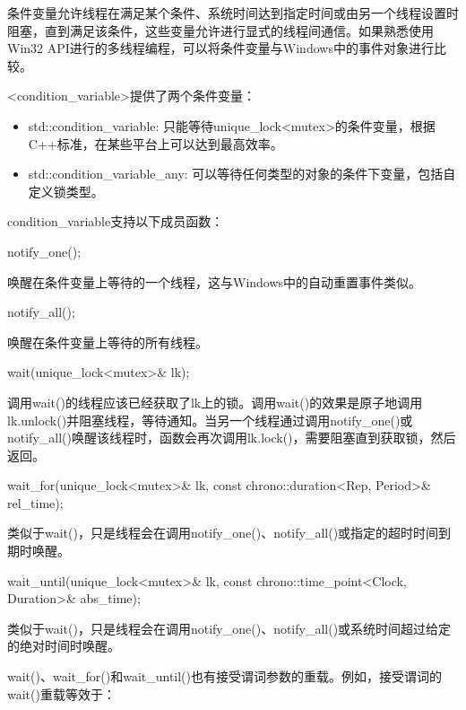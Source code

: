 
条件变量允许线程在满足某个条件、系统时间达到指定时间或由另一个线程设置时阻塞，直到满足该条件，这些变量允许进行显式的线程间通信。如果熟悉使用Win32 API进行的多线程编程，可以将条件变量与Windows中的事件对象进行比较。

<condition\_variable>提供了两个条件变量：

\begin{itemize}
\item
std::condition\_variable: 只能等待unique\_lock<mutex>的条件变量，根据C++标准，在某些平台上可以达到最高效率。

\item
std::condition\_variable\_any: 可以等待任何类型的对象的条件下变量，包括自定义锁类型。
\end{itemize}

condition\_variable支持以下成员函数：

\begin{cpp}
notify_one();
\end{cpp}

唤醒在条件变量上等待的一个线程，这与Windows中的自动重置事件类似。

\begin{cpp}
notify_all();
\end{cpp}

唤醒在条件变量上等待的所有线程。

\begin{cpp}
wait(unique_lock<mutex>& lk);
\end{cpp}

调用wait()的线程应该已经获取了lk上的锁。调用wait()的效果是原子地调用lk.unlock()并阻塞线程，等待通知。当另一个线程通过调用notify\_one()或notify\_all()唤醒该线程时，函数会再次调用lk.lock()，需要阻塞直到获取锁，然后返回。

\begin{cpp}
wait_for(unique_lock<mutex>& lk, const chrono::duration<Rep, Period>& rel_time);
\end{cpp}

类似于wait()，只是线程会在调用notify\_one()、notify\_all()或指定的超时时间到期时唤醒。

\begin{cpp}
wait_until(unique_lock<mutex>& lk, const chrono::time_point<Clock, Duration>& abs_time);
\end{cpp}

类似于wait()，只是线程会在调用notify\_one()、notify\_all()或系统时间超过给定的绝对时间时唤醒。

wait()、wait\_for()和wait\_until()也有接受谓词参数的重载。例如，接受谓词的wait()重载等效于：


